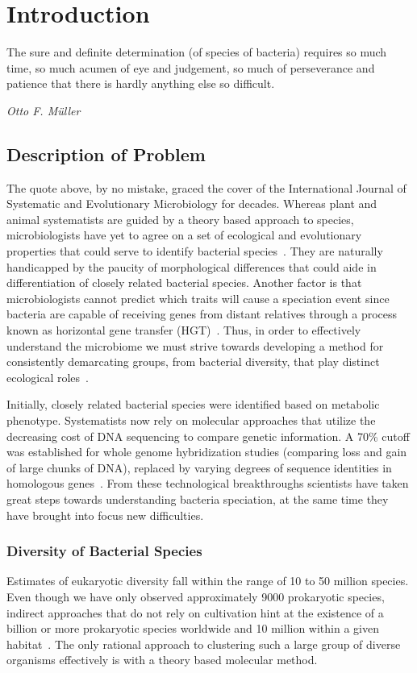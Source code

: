 \chapter{Introduction}
\begin{shadequote}
The sure and definite determination (of species of bacteria) requires so much time, so much acumen of eye and judgement, so much of perseverance and patience that there is hardly anything else so \mbox{difficult}. \par\emph{Otto F. M\"uller}
\end{shadequote}


\section{Description of Problem}
The quote above, by no mistake, graced the cover of the International Journal of Systematic and Evolutionary Microbiology for decades.
Whereas plant and animal systematists are guided by a theory based approach to  species, microbiologists have yet to agree on a set of ecological and evolutionary properties that could serve to identify bacterial species~\cite{cohan2007systematics}.
They are naturally handicapped by the paucity of morphological differences that could aide in differentiation of closely related bacterial species.
Another factor is that microbiologists cannot predict which traits will cause a speciation event since bacteria are capable of receiving genes from distant relatives through a process known as horizontal gene transfer (HGT)~\cite{cohan2007systematics}.
Thus, in order to effectively understand the microbiome we must strive towards developing a method for consistently demarcating groups, from bacterial diversity, that play distinct ecological roles~\cite{koeppel2008identifying}.


Initially, closely related bacterial species were identified based on metabolic phenotype.
Systematists now rely on molecular approaches that utilize the decreasing cost of DNA sequencing to compare genetic information.
A 70\% cutoff was established for whole genome hybridization studies (comparing loss and gain of large chunks of DNA), replaced by varying degrees of sequence identities in homologous genes~\cite{cohan2007systematics,carlo}.
From these technological breakthroughs scientists have taken great steps towards understanding bacteria speciation, at the same time they have brought into focus new difficulties.


\subsection{Diversity of Bacterial Species}
Estimates of eukaryotic diversity fall within the range of 10 to 50 million species. Even though we have only observed approximately 9000 prokaryotic species, indirect approaches that do not rely on cultivation hint at the existence of a billion or more prokaryotic species worldwide and 10 million within a given habitat~\cite{cohan2008origins}.
The only rational approach to clustering such a large group of diverse organisms effectively is with a theory based molecular method.


